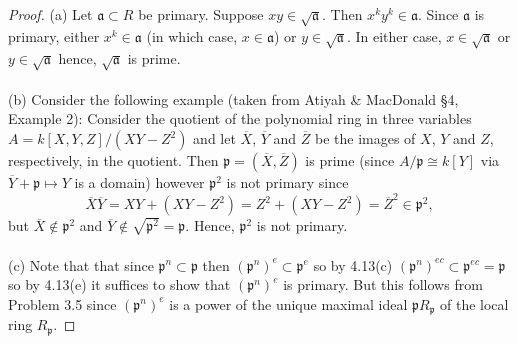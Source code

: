 \begin{proof}
(a) Let $\mathfrak{a}\subset R$ be primary. Suppose
$xy\in\sqrt{\mathfrak{a}}$. Then $x^ky^k\in\mathfrak{a}$. Since
$\mathfrak{a}$ is primary, either $x^k\in\mathfrak{a}$ (in which
case, $x\in\mathfrak{a}$) or $y\in\sqrt{\mathfrak{a}}$. In either
case, $x\in\sqrt{\mathfrak{a}}$ or $y\in\sqrt{\mathfrak{a}}$
hence, $\sqrt{\mathfrak{a}}$ is prime.
\\\\
(b) Consider the following example (taken from Atiyah \& MacDonald
\S4, Example 2): Consider the quotient of the polynomial ring in
three variables $A=k[X,Y,Z]/(XY-Z^2)$ and let $\overbar{X}$,
$\overbar{Y}$ and $\overbar{Z}$ be the images of $X$, $Y$ and
$Z$, respectively, in the quotient. Then
$\mathfrak{p}=(\overbar{X},\overbar{Z})$ is prime (since
$A/\mathfrak{p}\cong k[Y]$ via
$\overbar{Y}+\mathfrak{p}\mapsto Y$ is a domain)
however $\mathfrak{p}^2$ is not primary since
\[
\overbar{X}\overbar{Y}=XY+(XY-Z^2)=Z^2+(XY-Z^2)=\overbar{Z}^2\in\mathfrak{p}^2,
\]
but $\overbar{X}\notin\mathfrak{p}^2$ and
$\overbar{Y}\notin\sqrt{\mathfrak{p}^2}=\mathfrak{p}$. Hence,
$\mathfrak{p}^2$ is not primary.
\\\\
(c) Note that that since $\mathfrak{p}^n\subset\mathfrak{p}$ then
$(\mathfrak{p}^n)^e\subset\mathfrak{p}^e$ so by 4.13(c)
$(\mathfrak{p}^n)^{ec}\subset\mathfrak{p}^{ec}=\mathfrak{p}$ so
by 4.13(e) it suffices to show that $(\mathfrak{p}^n)^e$ is
primary. But this follows from Problem 3.5 since
$(\mathfrak{p}^n)^e$ is a power of the unique maximal ideal
$\mathfrak{p}R_{\mathfrak{p}}$ of the local ring
$R_{\mathfrak{p}}$.
\end{proof}

